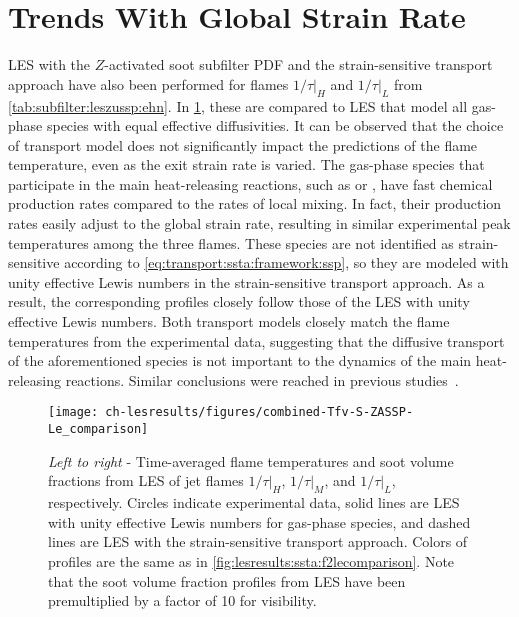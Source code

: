 \section{Trends With Global Strain Rate}
\label{sec:lesresults:strain}

LES with the $Z$-activated soot subfilter PDF and the strain-sensitive transport approach have also been performed for flames $1/\tau|_H$ and $1/\tau|_L$ from \cref{tab:subfilter:leszussp:ehn}. In \cref{fig:lesresults:strain:allflameslecomparison}, these are compared to LES that model all gas-phase species with equal effective diffusivities. It can be observed that the choice of transport model does not significantly impact the predictions of the flame temperature, even as the exit strain rate is varied. The gas-phase species that participate in the main heat-releasing reactions, such as  or , have fast chemical production rates compared to the rates of local mixing. In fact, their production rates easily adjust to the global strain rate, resulting in similar experimental peak temperatures among the three flames. These species are not identified as strain-sensitive according to \cref{eq:transport:ssta:framework:ssp}, so they are modeled with unity effective Lewis numbers in the strain-sensitive transport approach. As a result, the corresponding profiles closely follow those of the LES with unity effective Lewis numbers. Both transport models closely match the flame temperatures from the experimental data, suggesting that the diffusive transport of the aforementioned species is not important to the dynamics of the main heat-releasing reactions. Similar conclusions were reached in previous studies~\cite{attili2015,attili2016}.

\begin{figure}[htb]
  \centering
  \texttt{[image: ch-lesresults/figures/combined-Tfv-S-ZASSP-Le\_comparison]}
  \caption[Centerline \texorpdfstring{$\langle T \rangle$}{<T>} \& \texorpdfstring{$\langle f_V \rangle$}{<fV>} from LES of Flames \texorpdfstring{$1/\tau|_H$}{1/t|H}, \texorpdfstring{$1/\tau|_M$}{1/t|M}, and \texorpdfstring{$1/\tau|_L$}{1/t|L} with Various Transport Approaches]{\textit{Left to right} - Time-averaged flame temperatures and soot volume fractions from LES of jet flames $1/\tau|_H$, $1/\tau|_M$, and $1/\tau|_L$, respectively. Circles indicate experimental data, solid lines are LES with unity effective Lewis numbers for gas-phase species, and dashed lines are LES with the strain-sensitive transport approach. Colors of profiles are the same as in \cref{fig:lesresults:ssta:f2lecomparison}. Note that the soot volume fraction profiles from LES have been premultiplied by a factor of 10 for visibility.}
  \label{fig:lesresults:strain:allflameslecomparison}
\end{figure}

